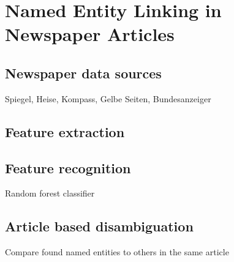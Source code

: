 \section{Named Entity Linking in Newspaper Articles}
\label{sec:nel}
\subsection{Newspaper data sources}
Spiegel, Heise, Kompass, Gelbe Seiten, Bundesanzeiger
\subsection{Feature extraction}
\subsection{Feature recognition}
Random forest classifier

\subsection{Article based disambiguation}
Compare found named entities to others in the same article
